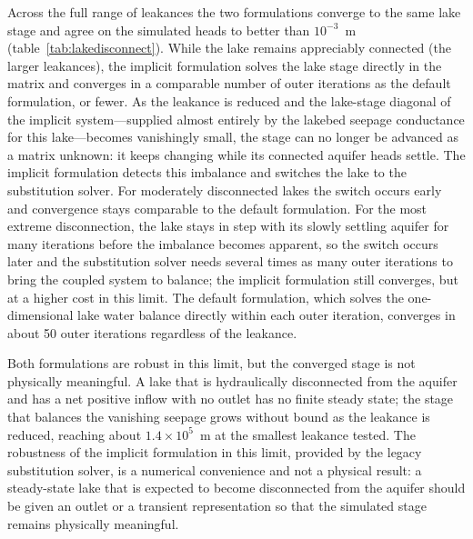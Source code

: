 Across the full range of leakances the two formulations converge to the same lake stage and agree on the simulated heads to better than $10^{-3}$~m (table~\ref{tab:lakedisconnect}). While the lake remains appreciably connected (the larger leakances), the implicit formulation solves the lake stage directly in the matrix and converges in a comparable number of outer iterations as the default formulation, or fewer. As the leakance is reduced and the lake-stage diagonal of the implicit system---supplied almost entirely by the lakebed seepage conductance for this lake---becomes vanishingly small, the stage can no longer be advanced as a matrix unknown: it keeps changing while its connected aquifer heads settle. The implicit formulation detects this imbalance and switches the lake to the substitution solver. For moderately disconnected lakes the switch occurs early and convergence stays comparable to the default formulation. For the most extreme disconnection, the lake stays in step with its slowly settling aquifer for many iterations before the imbalance becomes apparent, so the switch occurs later and the substitution solver needs several times as many outer iterations to bring the coupled system to balance; the implicit formulation still converges, but at a higher cost in this limit. The default formulation, which solves the one-dimensional lake water balance directly within each outer iteration, converges in about 50 outer iterations regardless of the leakance.

Both formulations are robust in this limit, but the converged stage is not physically meaningful. A lake that is hydraulically disconnected from the aquifer and has a net positive inflow with no outlet has no finite steady state; the stage that balances the vanishing seepage grows without bound as the leakance is reduced, reaching about $1.4 \times 10^{5}$~m at the smallest leakance tested. The robustness of the implicit formulation in this limit, provided by the legacy substitution solver, is a numerical convenience and not a physical result: a steady-state lake that is expected to become disconnected from the aquifer should be given an outlet or a transient representation so that the simulated stage remains physically meaningful.
